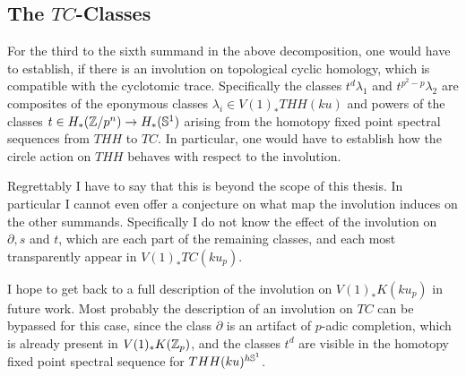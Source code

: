 \subsection{The $TC$-Classes}
For the third to the sixth summand in the above decomposition,
one would have to establish, if there is an involution on topological cyclic 
homology, which is compatible with the cyclotomic trace. Specifically the classes 
$t^d\lambda_1$ and $t^{p^2-p}\lambda_2$ are composites of the eponymous classes 
$\lambda_i\in V(1)_*THH(ku)$ and powers of the classes $t\in H_*(\Z/p^n)\rightarrow H_*(\S^1)$ 
arising from the homotopy fixed point spectral sequences from $THH$ to $TC$. In particular, 
one would have to establish how the circle action on $THH$ behaves with respect to the involution. 

Regrettably I have to say that this is beyond the scope of this thesis. In particular I cannot
even offer a conjecture on what map the involution induces on the other summands. Specifically
I do not know the effect of the involution on $\partial, s$ and $t$, which are each part
of the remaining classes, and each most transparently appear in $V(1)_*TC(ku_p)$.

I hope to get back to a full description of the involution on $V(1)_*K(ku_p)$ in future work.
Most probably the description of an involution on $TC$ can be bypassed for
this case, since the class $\partial$ is an artifact of $p$-adic completion,
which is already present in $V(1)_*K(\Z_p)$, and the classes $t^d$ are
visible in the homotopy fixed point spectral sequence for $THH(ku)^{h\S^1}$.

